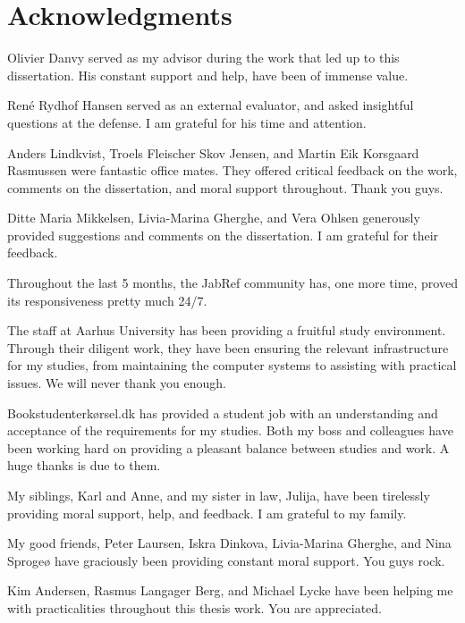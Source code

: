 \documentclass[twoside,11pt,openright,a4paper]{report}
\begin{document}
\chapter*{Acknowledgments}

Olivier Danvy served as my advisor during the work that led up to this
dissertation.  His constant support and help, have been of immense
value.

René Rydhof Hansen served as an external evaluator, and asked
insightful questions at the defense.  I am grateful for his time and
attention.

Anders Lindkvist, Troels Fleischer Skov Jensen, and Martin Eik
Korsgaard Rasmussen were fantastic office mates.  They offered
critical feedback on the work, comments on the dissertation, and moral
support throughout.  Thank you guys.

Ditte Maria Mikkelsen, Livia-Marina Gherghe, and Vera Ohlsen
generously provided suggestions and comments on the dissertation.
I am grateful for their feedback.

Throughout the last 5 months, the JabRef community has, one more time,
proved its responsiveness pretty much 24/7.

The staff at Aarhus University has been providing a fruitful study
environment.  Through their diligent work, they have been ensuring the
relevant infrastructure for my studies, from maintaining the computer
systems to assisting with practical issues.  We will never thank you
enough.

Bookstudenterkørsel.dk has provided a student job with an
understanding and acceptance of the requirements for my studies.  Both
my boss and colleagues have been working hard on providing a pleasant
balance between studies and work.  A huge thanks is due to them.

My siblings, Karl and Anne, and my sister in law, Julija, have been
tirelessly providing moral support, help, and feedback.  I am grateful
to my family.

My good friends, Peter Laursen, Iskra Dinkova, Livia-Marina Gherghe,
and Nina Sprogeø have graciously been providing constant moral
support.  You guys rock.

Kim Andersen, Rasmus Langager Berg, and Michael Lycke have been
helping me with practicalities throughout this thesis work.  You are
appreciated.

\tableofcontents
\newpage

\setcounter{secnumdepth}{2}
\end{document}
